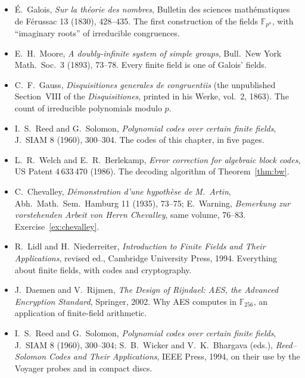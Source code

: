\begin{itemize}
\item \'E.~Galois, \emph{Sur la théorie des nombres}, Bulletin des sciences mathématiques de Férussac 13 (1830), 428--435. The first construction of the fields $\mathbb F_{p^n}$, with ``imaginary roots'' of irreducible congruences.
\item E.~H.~Moore, \emph{A doubly-infinite system of simple groups}, Bull.\ New York Math.\ Soc.\ 3 (1893), 73--78. Every finite field is one of Galois' fields.
\item C.~F.~Gauss, \emph{Disquisitiones generales de congruentiis} (the unpublished Section~VIII of the \emph{Disquisitiones}, printed in his Werke, vol.~2, 1863). The count of irreducible polynomials modulo $p$.
\item I.~S.~Reed and G.~Solomon, \emph{Polynomial codes over certain finite fields}, J.\ SIAM 8 (1960), 300--304. The codes of this chapter, in five pages.
\item L.~R.~Welch and E.~R.~Berlekamp, \emph{Error correction for algebraic block codes}, US Patent 4\,633\,470 (1986). The decoding algorithm of Theorem~\ref{thm:bw}.
\item C.~Chevalley, \emph{Démonstration d'une hypothèse de M.~Artin}, Abh.\ Math.\ Sem.\ Hamburg 11 (1935), 73--75; E.~Warning, \emph{Bemerkung zur vorstehenden Arbeit von Herrn Chevalley}, same volume, 76--83. Exercise~\ref{ex:chevalley}.
\item R.~Lidl and H.~Niederreiter, \emph{Introduction to Finite Fields and Their Applications}, revised ed., Cambridge University Press, 1994. Everything about finite fields, with codes and cryptography.
\item J.~Daemen and V.~Rijmen, \emph{The Design of Rijndael: AES, the Advanced Encryption Standard}, Springer, 2002. Why AES computes in $\mathbb F_{256}$, an application of finite-field arithmetic.
\item I.~S.~Reed and G.~Solomon, \emph{Polynomial codes over certain finite fields}, J.\ SIAM 8 (1960), 300--304; S.~B.~Wicker and V.~K.~Bhargava (eds.), \emph{Reed--Solomon Codes and Their Applications}, IEEE Press, 1994, on their use by the Voyager probes and in compact discs.
\end{itemize}
